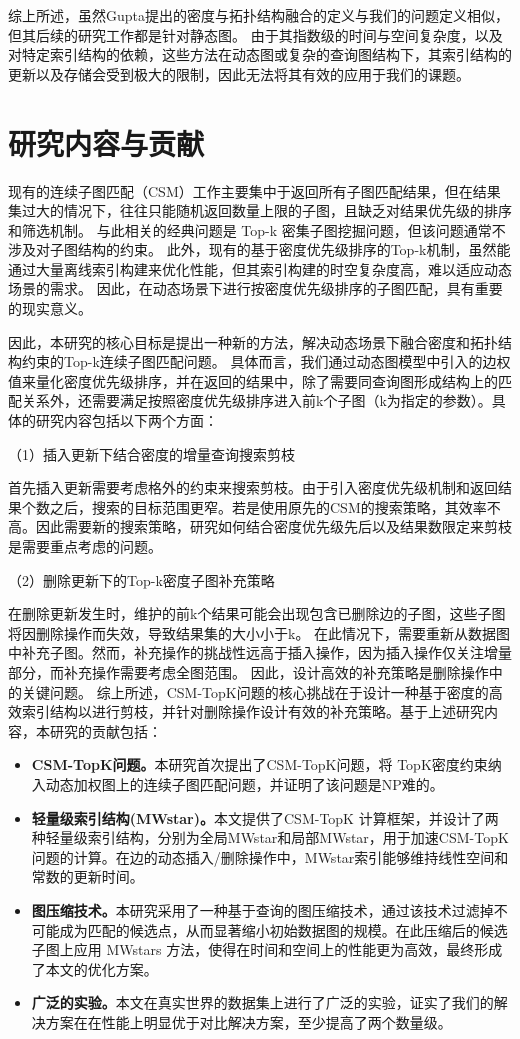 综上所述，虽然Gupta提出的密度与拓扑结构融合的定义与我们的问题定义相似，但其后续的研究工作都是针对静态图。
由于其指数级的时间与空间复杂度，以及对特定索引结构的依赖，这些方法在动态图或复杂的查询图结构下，其索引结构的更新以及存储会受到极大的限制，因此无法将其有效的应用于我们的课题。
\section{研究内容与贡献}
现有的连续子图匹配（CSM）工作主要集中于返回所有子图匹配结果，但在结果集过大的情况下，往往只能随机返回数量上限的子图，且缺乏对结果优先级的排序和筛选机制。
与此相关的经典问题是 Top-k 密集子图挖掘问题，但该问题通常不涉及对子图结构的约束。
此外，现有的基于密度优先级排序的Top-k机制，虽然能通过大量离线索引构建来优化性能，但其索引构建的时空复杂度高，难以适应动态场景的需求。
因此，在动态场景下进行按密度优先级排序的子图匹配，具有重要的现实意义。

因此，本研究的核心目标是提出一种新的方法，解决动态场景下融合密度和拓扑结构约束的Top-k连续子图匹配问题。
具体而言，我们通过动态图模型中引入的边权值来量化密度优先级排序，并在返回的结果中，除了需要同查询图形成结构上的匹配关系外，还需要满足按照密度优先级排序进入前k个子图（k为指定的参数）。具体的研究内容包括以下两个方面：

（1）插入更新下结合密度的增量查询搜索剪枝

      首先插入更新需要考虑格外的约束来搜索剪枝。由于引入密度优先级机制和返回结果个数之后，搜索的目标范围更窄。若是使用原先的CSM的搜索策略，其效率不高。因此需要新的搜索策略，研究如何结合密度优先级先后以及结果数限定来剪枝是需要重点考虑的问题。

（2）删除更新下的Top-k密度子图补充策略

   在删除更新发生时，维护的前k个结果可能会出现包含已删除边的子图，这些子图将因删除操作而失效，导致结果集的大小小于k。
   在此情况下，需要重新从数据图中补充子图。然而，补充操作的挑战性远高于插入操作，因为插入操作仅关注增量部分，而补充操作需要考虑全图范围。
   因此，设计高效的补充策略是删除操作中的关键问题。
   综上所述，CSM-TopK问题的核心挑战在于设计一种基于密度的高效索引结构以进行剪枝，并针对删除操作设计有效的补充策略。基于上述研究内容，本研究的贡献包括：
\begin{itemize}[label={\textbullet}]
    \item \textbf{CSM-TopK问题。}本研究首次提出了CSM-TopK问题，将 TopK密度约束纳入动态加权图上的连续子图匹配问题，并证明了该问题是NP难的。
    \item \textbf{轻量级索引结构(MWstar)。}本文提供了CSM-TopK 计算框架，并设计了两种轻量级索引结构，分别为全局MWstar和局部MWstar，用于加速CSM-TopK问题的计算。在边的动态插入/删除操作中，MWstar索引能够维持线性空间和常数的更新时间。
    \item \textbf{图压缩技术。}本研究采用了一种基于查询的图压缩技术，通过该技术过滤掉不可能成为匹配的候选点，从而显著缩小初始数据图的规模。在此压缩后的候选子图上应用 MWstars 方法，使得在时间和空间上的性能更为高效，最终形成了本文的优化方案。
    \item \textbf{广泛的实验。}本文在真实世界的数据集上进行了广泛的实验，证实了我们的解决方案在在性能上明显优于对比解决方案，至少提高了两个数量级。
  \end{itemize}
